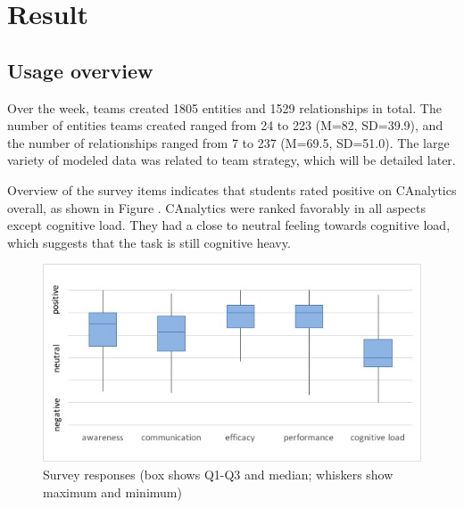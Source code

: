 \documentclass[]{article}
\date{}
\begin{document}
\makeatletter
\long{}
\makeatother

\makeatletter
\let\@oldmakecaption=\@makecaption
\let\oldthefigure=\thefigure
\let\oldtheHfigure=\theHfigure
\makeatother

\makeatletter
{}
\newenvironment{no-prefix-figure-caption}{
  \let\@makecaption=\@makenoprefixcaption
  \renewcommand\thefigure{x.\thefigno}
  \renewcommand\theHfigure{x.\thefigno}
  \stepcounter{figno}
}{
  \let\thefigure=\oldthefigure
  \let\theHfigure=\oldtheHfigure
  \let\@makecaption=\@oldmakecaption
  \addtocounter{figure}{-1}
}
\makeatother

\section{Result}\label{result}

\subsection{Usage overview}\label{usage-overview}

Over the week, teams created 1805 entities and 1529 relationships in
total. The number of entities teams created ranged from 24 to 223 (M=82,
SD=39.9), and the number of relationships ranged from 7 to 237 (M=69.5,
SD=51.0). The large variety of modeled data was related to team
strategy, which will be detailed later.

Overview of the survey items indicates that students rated positive on
CAnalytics overall, as shown in Figure \autocite{fig:survey}. CAnalytics
were ranked favorably in all aspects except cognitive load. They had a
close to neutral feeling towards cognitive load, which suggests that the
task is still cognitive heavy.

\begin{figure}
\centering
\includegraphics{./survey/survey_boxchart.jpg}
\caption{Survey responses (box shows Q1-Q3 and median; whiskers show
maximum and minimum)\label{fig:survey}}
\end{figure}
\end{document}
